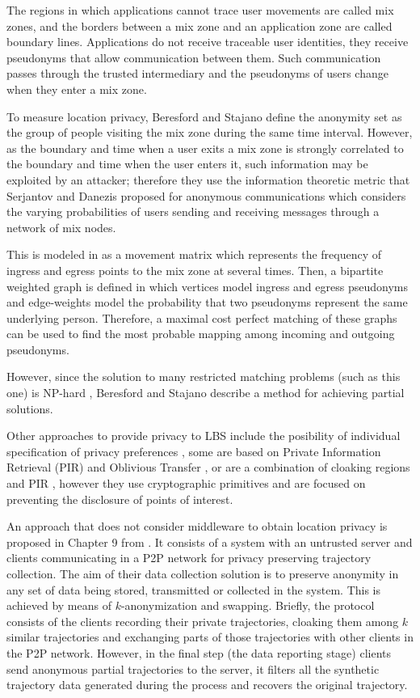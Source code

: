 \documentclass{llncs}
\begin{document}
The regions in which applications cannot trace user movements are called mix zones, and the borders between a mix zone and an application zone are called boundary lines.
Applications do not receive traceable user identities, they receive pseudonyms that allow communication between them. Such communication passes through the trusted intermediary and the pseudonyms of users change when they enter a mix zone.


To measure location privacy, Beresford and Stajano \cite{Beresford04mixzones} define the anonymity set as the group of people visiting the mix zone during the same time interval. However, as the boundary and time when a user exits a mix zone is strongly correlated to the boundary and time when the user enters it, such information may be exploited by an attacker; therefore they use the information theoretic metric that Serjantov and Danezis \cite{Serjantov2002} proposed for anonymous communications which considers the varying probabilities of users sending and receiving messages through a network of mix nodes.


This is modeled in \cite{Beresford04mixzones} as a movement matrix which represents the frequency of ingress and egress points to the mix zone at several times.
Then, a bipartite weighted graph is defined in which vertices model ingress and egress pseudonyms and edge-weights
model the probability that two pseudonyms represent the same underlying person. Therefore, a maximal cost perfect matching of these graphs can be used to find the most probable mapping among incoming and outgoing pseudonyms.

However, since the solution to many restricted matching problems (such as this one) is NP-hard \cite{Tanimoto1978}, Beresford and Stajano \cite{Beresford04mixzones} describe a method for achieving partial solutions.

Other approaches to provide privacy to LBS include the posibility of individual specification of privacy preferences \cite{Damiani:2009}, some are based on Private Information Retrieval (PIR) and Oblivious Transfer \cite{Paulet:2014}, or are a combination of cloaking regions and PIR \cite{Ghinita:2011}, however they use cryptographic primitives and are focused on preventing the disclosure of points of interest.

An approach that does not consider middleware to obtain location privacy is proposed in Chapter 9 from \cite{Gidofalvi2007}. It consists of a system with an untrusted server and clients communicating in a P2P network for privacy preserving trajectory collection.
The aim of their data collection solution is to preserve anonymity in any set of data being stored, transmitted or
collected in the system. This is achieved by means of $k$-anonymization and swapping.
Briefly, the protocol consists of the clients recording their private trajectories, cloaking them among $k$ similar trajectories and exchanging parts of those trajectories with other clients in the P2P network. However, in the final step (the data reporting stage) clients send anonymous partial trajectories to the server, it filters all the synthetic trajectory data generated during the process and recovers the original trajectory.
\end{document}
